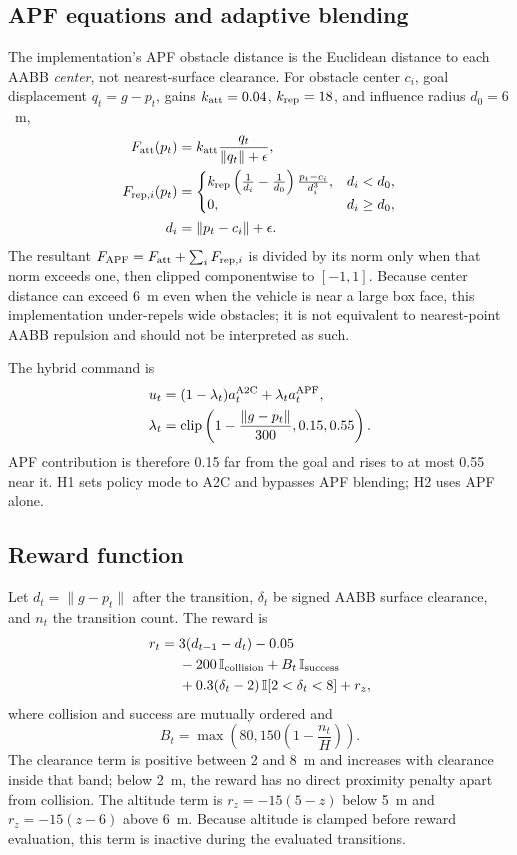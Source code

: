\documentclass[conference]{IEEEtran}
\begin{document}
\subsection{APF equations and adaptive blending}
The implementation's APF obstacle distance is the Euclidean distance to each AABB \emph{center}, not nearest-surface clearance. For obstacle center $c_i$, goal displacement $q_t=g-p_t$, gains $k_{\rm att}=0.04$, $k_{\rm rep}=18$, and influence radius $d_0=6$~m,
\begin{align}
F_{\rm att}(p_t)&=k_{\rm att}\frac{q_t}{\|q_t\|+\epsilon},\\
F_{{\rm rep},i}(p_t)&=
\begin{cases}
k_{\rm rep}\left(\frac{1}{d_i}-\frac{1}{d_0}\right)\frac{p_t-c_i}{d_i^3},&d_i<d_0,\\
0,&d_i\ge d_0,
\end{cases}\\
d_i&=\|p_t-c_i\|+\epsilon.
\end{align}
The resultant $F_{\rm APF}=F_{\rm att}+\sum_iF_{{\rm rep},i}$ is divided by its norm only when that norm exceeds one, then clipped componentwise to $[-1,1]$. Because center distance can exceed 6~m even when the vehicle is near a large box face, this implementation under-repels wide obstacles; it is not equivalent to nearest-point AABB repulsion and should not be interpreted as such.

The hybrid command is
\begin{align}
u_t&=(1-\lambda_t)a_t^{\rm A2C}+\lambda_t a_t^{\rm APF},\\
\lambda_t&=\operatorname{clip}\left(1-\frac{\|g-p_t\|}{300},0.15,0.55\right).
\end{align}
APF contribution is therefore 0.15 far from the goal and rises to at most 0.55 near it. H1 sets policy mode to A2C and bypasses APF blending; H2 uses APF alone.

\subsection{Reward function}
Let $d_t=\|g-p_t\|$ after the transition, $\delta_t$ be signed AABB surface clearance, and $n_t$ the transition count. The reward is
\begin{equation}
\begin{split}
r_t={}&3(d_{t-1}-d_t)-0.05\\
&-200\,\mathbb{I}_{\rm collision}+B_t\,\mathbb{I}_{\rm success}\\
&+0.3(\delta_t-2)\,\mathbb{I}[2<\delta_t<8]+r_z,
\end{split}
\end{equation}
where collision and success are mutually ordered and
\begin{equation}
B_t=\max\left(80,150\left(1-\frac{n_t}{H}\right)\right).
\end{equation}
The clearance term is positive between 2 and 8~m and increases with clearance inside that band; below 2~m, the reward has no direct proximity penalty apart from collision. The altitude term is $r_z=-15(5-z)$ below 5~m and $r_z=-15(z-6)$ above 6~m. Because altitude is clamped before reward evaluation, this term is inactive during the evaluated transitions.
\end{document}

